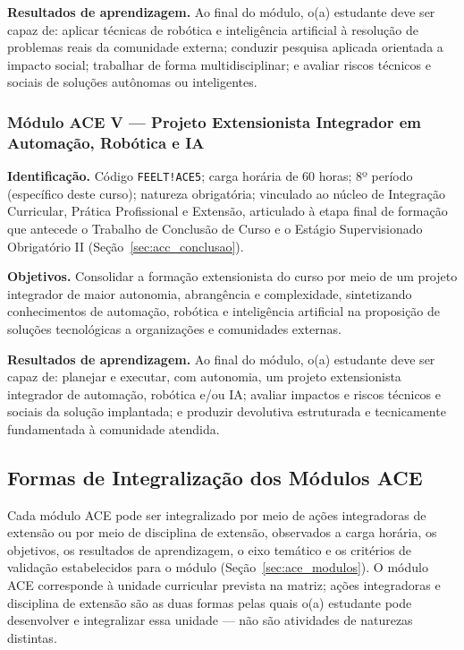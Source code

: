 \textbf{Resultados de aprendizagem.} Ao final do módulo, o(a) estudante deve ser capaz de: aplicar técnicas de robótica e inteligência artificial à resolução de problemas reais da comunidade externa; conduzir pesquisa aplicada orientada a impacto social; trabalhar de forma multidisciplinar; e avaliar riscos técnicos e sociais de soluções autônomas ou inteligentes.

\subsubsection{Módulo ACE V --- Projeto Extensionista Integrador em Automação, Robótica e IA}
\label{sec:ace5}

\textbf{Identificação.} Código \texttt{FEELT!ACE5}; carga horária de 60 horas; 8º período (específico deste curso); natureza obrigatória; vinculado ao núcleo de Integração Curricular, Prática Profissional e Extensão, articulado à etapa final de formação que antecede o Trabalho de Conclusão de Curso e o Estágio Supervisionado Obrigatório II (Seção~\ref{sec:acc_conclusao}).

\textbf{Objetivos.} Consolidar a formação extensionista do curso por meio de um projeto integrador de maior autonomia, abrangência e complexidade, sintetizando conhecimentos de automação, robótica e inteligência artificial na proposição de soluções tecnológicas a organizações e comunidades externas.

\textbf{Resultados de aprendizagem.} Ao final do módulo, o(a) estudante deve ser capaz de: planejar e executar, com autonomia, um projeto extensionista integrador de automação, robótica e/ou IA; avaliar impactos e riscos técnicos e sociais da solução implantada; e produzir devolutiva estruturada e tecnicamente fundamentada à comunidade atendida.

\subsection{Formas de Integralização dos Módulos ACE}
\label{sec:ace_formas_integralizacao}

Cada módulo ACE pode ser integralizado por meio de ações integradoras de extensão ou por meio de disciplina de extensão, observados a carga horária, os objetivos, os resultados de aprendizagem, o eixo temático e os critérios de validação estabelecidos para o módulo (Seção~\ref{sec:ace_modulos}\unskip). O módulo ACE corresponde à unidade curricular prevista na matriz; ações integradoras e disciplina de extensão são as duas formas pelas quais o(a) estudante pode desenvolver e integralizar essa unidade — não são atividades de naturezas distintas.

